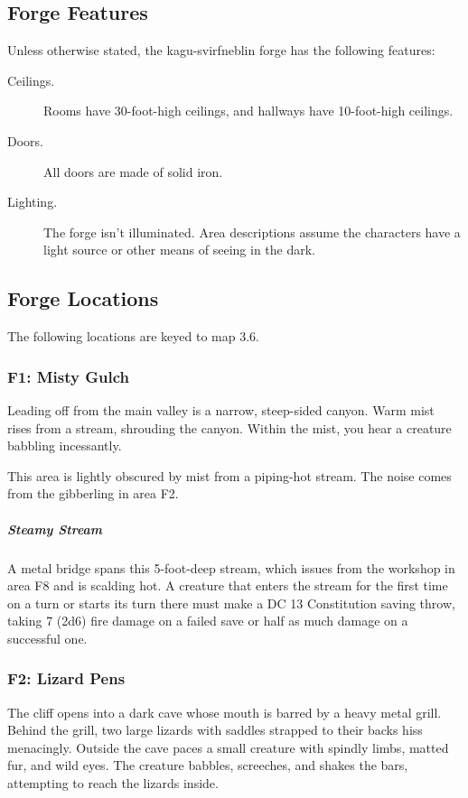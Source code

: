 \documentclass[10pt,a4paper,twoside,bg=print,twocolumn,openany,nodeprecatedcode]{dndbook}
\begin{document}
\subsection{Forge Features}
Unless otherwise stated, the kagu-svirfneblin forge has the following features:


\begin{description}
\item[Ceilings.]
Rooms have 30-foot-high ceilings, and hallways have 10-foot-high ceilings.
\item[Doors.]
All doors are made of solid iron.
\item[Lighting.]
The forge isn't illuminated. Area descriptions assume the characters have a light source or other means of seeing in the dark.
\end{description}

\subsection{Forge Locations}
The following locations are keyed to map 3.6.

\subsubsection{F1: Misty Gulch}
\begin{DndReadAloud}{}
Leading off from the main valley is a narrow, steep-sided canyon. Warm mist rises from a stream, shrouding the canyon. Within the mist, you hear a creature babbling incessantly.

\end{DndReadAloud}

This area is lightly obscured by mist from a piping-hot stream. The noise comes from the gibberling in area F2.

\subparagraph{Steamy Stream}
A metal bridge spans this 5-foot-deep stream, which issues from the workshop in area F8 and is scalding hot. A creature that enters the stream for the first time on a turn or starts its turn there must make a DC 13 Constitution saving throw, taking 7 (2d6) fire damage on a failed save or half as much damage on a successful one.

\subsubsection{F2: Lizard Pens}
\begin{DndReadAloud}{}
The cliff opens into a dark cave whose mouth is barred by a heavy metal grill. Behind the grill, two large lizards with saddles strapped to their backs hiss menacingly. Outside the cave paces a small creature with spindly limbs, matted fur, and wild eyes. The creature babbles, screeches, and shakes the bars, attempting to reach the lizards inside.

\end{DndReadAloud}
\end{document}
